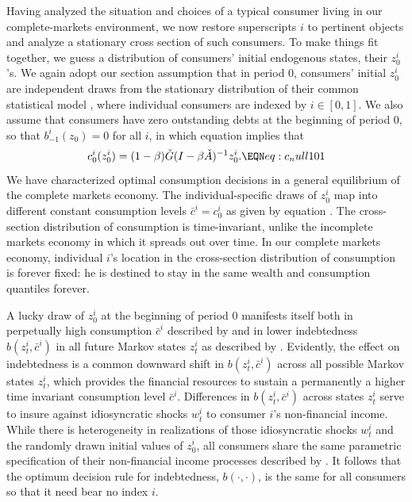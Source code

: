 Having analyzed the situation and choices of a typical consumer living 
in our complete-markets environment, we now restore  superscripts $i$ to pertinent 
objects and analyze a stationary cross section of such consumers.
To make things fit together, we  guess a distribution of consumers'
initial endogenous states, their  $z^i_0$'s.
We again adopt our  section
 assumption that in 
period $0$, consumers' initial $z^i_0$ are 
independent draws from the stationary distribution  
of their common statistical model ,
where individual consumers are indexed by 
$i\in[0,1]$. We also assume that consumers have 
zero 
outstanding debts at the beginning of period $0$, 
so that $b_{-1}^i(z_0) = 0$ for all $i$, in which equation  implies that 
$$
c^i_0(z^i_0) = (1-\beta) \check G(I-\beta \check A)^{-1} z^i_0 .
\EQN eq:c_null101
$$
We have  characterized
optimal consumption decisions  in a general equilibrium of the
complete markets economy.
The individual-specific draws of $z^i_0$ map 
into different constant consumption levels 
$\bar c^i = c^i_0$ as given by equation 
. The cross-section distribution of consumption is time-invariant, unlike the
incomplete markets economy in which  it spreads out over time.  In our complete markets economy,
 individual $i$'s location in the cross-section distribution of consumption is forever fixed: he is destined to stay  in the same wealth and consumption  quantiles forever. 

A lucky draw of $z^i_0$ at the beginning
of period $0$ manifests itself both in perpetually 
high consumption $\bar c^i$ described  by
 and in  
lower indebtedness $b(z^i_{t}, \bar c^i)$ in 
all future Markov states $z^i_{t}$ as described  by
. Evidently, the effect on 
indebtedness is a common  downward
shift in $b(z^i_{t}, \bar c^i)$ across all 
possible Markov states $z^i_{t}$, which provides
the financial resources  to sustain a permanently 
a higher time invariant 
consumption level $\bar c^i$. Differences in 
$b(z^i_{t}, \bar c^i)$ across 
states $z^i_{t}$  serve to insure 
against idiosyncratic shocks $w^i_{t}$ to  
consumer $i$'s non-financial income.
While there is  heterogeneity in  realizations
of those idiosyncratic shocks $w^i_{t}$ and 
the randomly drawn initial values of $z^i_0$, 
all consumers share the same parametric 
specification of their non-financial income processes described by  . It follows that the 
optimum decision rule for indebtedness, 
$b(\cdot, \cdot)$, is the same for all 
consumers so that it need  bear no index $i$.


